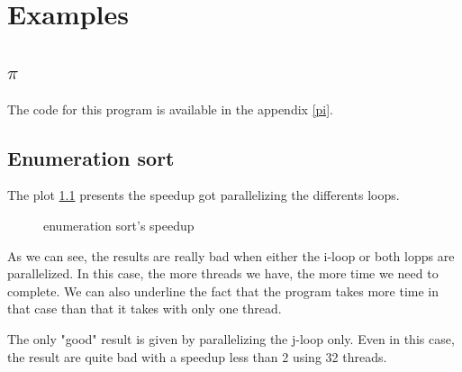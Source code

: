 \chapter{Examples}

\section{$\pi$}

The code for this program is available in the appendix \ref{pi}.

\section{Enumeration sort}

The plot \ref{enumsort_plot} presents the speedup got parallelizing the differents loops.

\begin{figure}[!h]
  \begin{center}
  \end{center}
  \caption{enumeration sort's speedup}
  \label{enumsort_plot}
\end{figure} 

As we can see, the results are really bad when either the i-loop or both lopps are parallelized. In this case, the more threads we have, the more time we need to complete. We can also underline the fact that the program takes more time in that case than that it takes with only one thread.

The only "good" result is given by parallelizing the j-loop only. Even in this case, the result are quite bad with a speedup less than 2 using 32 threads.

